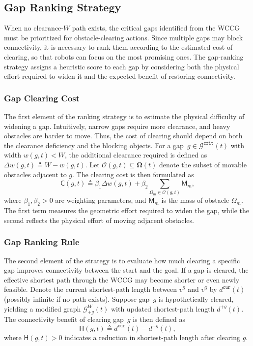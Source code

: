 \subsection{Gap Ranking Strategy}
\label{subsec:gap}

When no clearance-$W$ path exists, the critical gaps identified from the
WCCG must be prioritized for obstacle-clearing actions. Since multiple gaps
may block connectivity, it is necessary to rank them according to the
estimated cost of clearing, so that robots can focus on the most promising
ones. The gap-ranking strategy assigns a heuristic score to each gap by
considering both the physical effort required to widen it and the expected
benefit of restoring connectivity.

\subsubsection{Gap Clearing Cost}
\label{subsubsec:gap-cost}
The first element of the ranking strategy is to estimate the physical
difficulty of widening a gap. Intuitively, narrow gaps require more
clearance, and heavy obstacles are harder to move. Thus, the cost of
clearing should depend on both the clearance deficiency and the blocking
objects. For a gap~$g\in\mathcal{G}^{\texttt{crit}}(t)$ with width
$w(g,t)<W$, the additional clearance required is defined as
$\Delta w(g,t)\triangleq W-w(g,t)$. Let
$\mathcal{O}(g,t)\subseteq\boldsymbol{\Omega}(t)$ denote the subset of
movable obstacles adjacent to $g$. The clearing cost is then formulated as
\begin{equation}\label{eq:gap-cost}
  \mathsf{C}(g,t)\triangleq \beta_1 \Delta w(g,t)
  + \beta_2 \sum_{\Omega_m\in\mathcal{O}(g,t)} \mathsf{M}_m,
\end{equation}
where $\beta_1,\beta_2>0$ are weighting parameters, and $\mathsf{M}_m$ is
the mass of obstacle $\Omega_m$. The first term measures the geometric
effort required to widen the gap, while the second reflects the physical
effort of moving adjacent obstacles.

\subsubsection{Gap Ranking Rule}
\label{subsubsec:gap-ranking-rule}
The second element of the strategy is to evaluate how much clearing a
specific gap improves connectivity between the start and the goal. If a
gap is cleared, the effective shortest path through the WCCG may become
shorter or even newly feasible. Denote the current shortest-path length
between $v^{\texttt{S}}$ and $v^{\texttt{G}}$ by $d^{\texttt{cur}}(t)$
(possibly infinite if no path exists). Suppose gap~$g$ is hypothetically
cleared, yielding a modified graph $\mathcal{G}^{W}_{+g}(t)$ with updated
shortest-path length $d^{+g}(t)$. The connectivity benefit of clearing
gap~$g$ is then defined as
\begin{equation}\label{eq:gap-benefit}
  \mathsf{H}(g,t)\triangleq
  d^{\texttt{cur}}(t) - d^{+g}(t),
\end{equation}
where $\mathsf{H}(g,t)>0$ indicates a reduction in shortest-path length
after clearing $g$.

